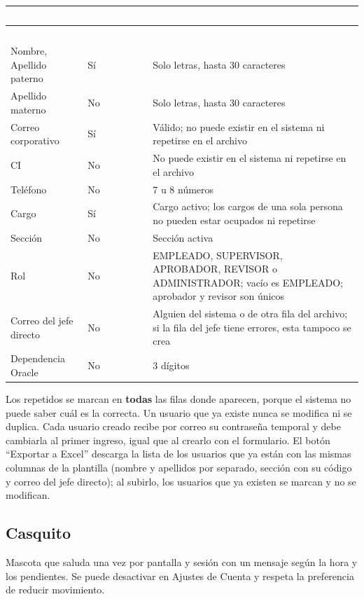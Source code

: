 \documentclass[11pt,letterpaper]{article}
\newcommand{\cabecera}{\rowcolor{maxamPrimario}}
\newcommand{\tth}[1]{\textcolor{white}{\textbf{#1}}}
\begin{document}
\begin{xltabular}{\textwidth}{L{4.2cm} L{2.2cm} Y}
\cabecera \tth{Columna} & \tth{Obligatoria} & \tth{Regla} \\
\endfirsthead
\cabecera \tth{Columna} & \tth{Obligatoria} & \tth{Regla} \\
\endhead
{} Nombre, Apellido paterno & Sí & Solo letras, hasta 30 caracteres \\
Apellido materno & No & Solo letras, hasta 30 caracteres \\
 Correo corporativo & Sí & Válido; no puede existir en el sistema ni repetirse en el archivo \\
CI & No & No puede existir en el sistema ni repetirse en el archivo \\
 Teléfono & No & 7 u 8 números \\
Cargo & Sí & Cargo activo; los cargos de una sola persona no pueden estar ocupados ni repetirse \\
 Sección & No & Sección activa \\
Rol & No & EMPLEADO, SUPERVISOR, APROBADOR, REVISOR o ADMINISTRADOR; vacío es EMPLEADO; aprobador y revisor son únicos \\
 Correo del jefe directo & No & Alguien del sistema o de otra fila del archivo; si la fila del jefe tiene errores, esta tampoco se crea \\
Dependencia Oracle & No & 3 dígitos \\
\end{xltabular}

Los repetidos se marcan en \textbf{todas} las filas donde aparecen, porque el sistema no puede saber cuál es la correcta. Un usuario que ya existe nunca se modifica ni se duplica. Cada usuario creado recibe por correo su contraseña temporal y debe cambiarla al primer ingreso, igual que al crearlo con el formulario. El botón ``Exportar a Excel'' descarga la lista de los usuarios que ya están con las mismas columnas de la plantilla (nombre y apellidos por separado, sección con su código y correo del jefe directo); al subirlo, los usuarios que ya existen se marcan y no se modifican.

\subsection{Casquito}
Mascota que saluda una vez por pantalla y sesión con un mensaje según la hora y los pendientes. Se puede desactivar en Ajustes de Cuenta y respeta la preferencia de reducir movimiento.
\end{document}

